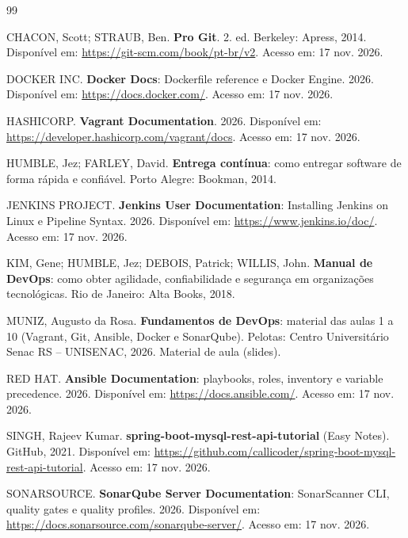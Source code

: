\clearpage
{}
{}
\renewcommand{\refname}{Referências}
\begingroup
{}
\small
\begin{thebibliography}{99}
  \setlength{\itemsep}{0.55em}

  CHACON, Scott; STRAUB, Ben. \textbf{Pro Git}. 2. ed. Berkeley: Apress, 2014. Disponível em:
  \url{https://git-scm.com/book/pt-br/v2}. Acesso em: 17 nov. 2026.

  DOCKER INC. \textbf{Docker Docs}: Dockerfile reference e Docker Engine. 2026. Disponível em:
  \url{https://docs.docker.com/}. Acesso em: 17 nov. 2026.

  HASHICORP. \textbf{Vagrant Documentation}. 2026. Disponível em:
  \url{https://developer.hashicorp.com/vagrant/docs}. Acesso em: 17 nov. 2026.

  HUMBLE, Jez; FARLEY, David. \textbf{Entrega contínua}: como entregar software de forma rápida e
  confiável. Porto Alegre: Bookman, 2014.

  JENKINS PROJECT. \textbf{Jenkins User Documentation}: Installing Jenkins on Linux e Pipeline
  Syntax. 2026. Disponível em: \url{https://www.jenkins.io/doc/}. Acesso em: 17 nov. 2026.

  KIM, Gene; HUMBLE, Jez; DEBOIS, Patrick; WILLIS, John. \textbf{Manual de DevOps}: como obter
  agilidade, confiabilidade e segurança em organizações tecnológicas. Rio de Janeiro: Alta Books,
  2018.

  MUNIZ, Augusto da Rosa. \textbf{Fundamentos de DevOps}: material das aulas 1 a 10 (Vagrant,
  Git, Ansible, Docker e SonarQube). Pelotas: Centro Universitário Senac RS -- UNISENAC, 2026.
  Material de aula (slides).

  RED HAT. \textbf{Ansible Documentation}: playbooks, roles, inventory e variable precedence. 2026.
  Disponível em: \url{https://docs.ansible.com/}. Acesso em: 17 nov. 2026.

  SINGH, Rajeev Kumar. \textbf{spring-boot-mysql-rest-api-tutorial} (Easy Notes). GitHub, 2021.
  Disponível em: \url{https://github.com/callicoder/spring-boot-mysql-rest-api-tutorial}.
  Acesso em: 17 nov. 2026.

  SONARSOURCE. \textbf{SonarQube Server Documentation}: SonarScanner CLI, quality gates e
  quality profiles. 2026. Disponível em: \url{https://docs.sonarsource.com/sonarqube-server/}.
  Acesso em: 17 nov. 2026.

\end{thebibliography}
\endgroup

